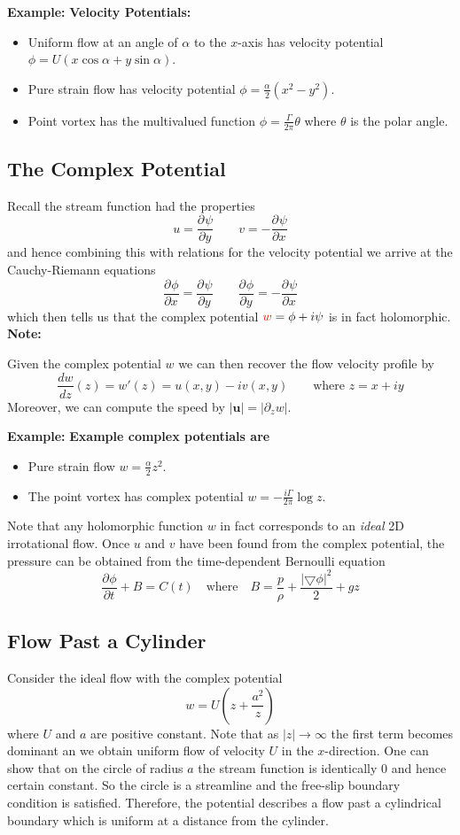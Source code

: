 \documentclass[11pt]{article}
\newcommand*{\pd}[3][]{\ensuremath{\frac{\partial^{#1} {#2}}{\partial {#3}^{#1}}}}
\newcommand{\grad}{\bigtriangledown}
\newcommand{\mv}[1]{\bm{#1}}
\newcommand{\mdf}[1]{{\color{red}#1}}
\newcommand{\abs}[1]{\left|#1\right|}
\newenvironment{eg}
{\begin{mdframed}[backgroundcolor=mylg, roundcorner=5pt, linewidth=0pt]\textbf{Example: }\normalfont}
    {\end{mdframed}}
\newenvironment{note}
    {\textbf{Note:}\begin{mdframed}[backgroundcolor=white, roundcorner=5pt, linewidth=0pt]}
    {\end{mdframed}}
\begin{document}
\begin{eg}
	\textbf{Velocity Potentials: }
	\begin{itemize}
		\item Uniform flow at an angle of $\alpha$ to the $x$-axis has velocity potential $\phi = U(x\cos\alpha + y \sin\alpha)$.
		\item Pure strain flow has velocity potential $\phi = \frac{\alpha}{2}(x^2 - y^2)$.
		\item Point vortex has the multivalued function $\phi = \frac{\Gamma}{2 \pi}\theta$ where $\theta$ is the polar angle.
	\end{itemize}
\end{eg}

\subsection{The Complex Potential}
Recall the stream function had the properties
\[
	u = \pd{\psi}{y} \quad\quad v = - \pd{\psi}{x}
\]
and hence combining this with relations for the velocity potential we arrive at the Cauchy-Riemann equations
\[
	\pd{\phi}{x}=\pd{\psi}{y}\quad\quad\pd{\phi}{y}=-\pd{\psi}{x}
\]
which then tells us that the \mdf{complex potential} $\mdf{w}=\phi + i \psi$ is in fact holomorphic.
\begin{note}
Given the complex potential $w$ we can then recover the flow velocity profile by
\[
	\frac{dw}{dz}(z) = w'(z) = u(x, y) - i v(x, y)\quad\quad\text{where }z=x+iy
\]
Moreover, we can compute the speed by $\abs{\mv{u}} = \abs{\partial_z w}$.
\end{note}

\begin{eg}
	\textbf{Example complex potentials are}
	\begin{itemize}
		\item Pure strain flow $w = \frac{\alpha}{2}z^2$.
		\item The point vortex has complex potential $w=-\frac{i\Gamma}{2\pi}\log z$.
	\end{itemize}
\end{eg}

Note that any holomorphic function $w$ in fact corresponds to an \emph{ideal} 2D irrotational flow.
Once $u$ and $v$ have been found from the complex potential, the pressure can be obtained from the time-dependent Bernoulli equation
\[
	\pd{\phi}{t} + B = C(t) \quad\text{where}\quad B = \frac{p}{\rho}+\frac{\abs{\grad\phi}^2}{2}+gz	
\]

\subsection{Flow Past a Cylinder}
Consider the ideal flow with the complex potential
\[
	w= U\left( z + \frac{a^2}{z}\right)
\]
where $U$ and $a$ are positive constant.
Note that as $\abs{z}\to\infty$ the first term becomes dominant an we obtain uniform flow of velocity $U$ in the $x$-direction.
One can show that on the circle of radius $a$ the stream function is identically $0$ and hence certain constant.
So the circle is a streamline and the free-slip boundary condition is satisfied.
Therefore, the potential describes a flow past a cylindrical boundary which is uniform at a distance from the cylinder.
\end{document}

